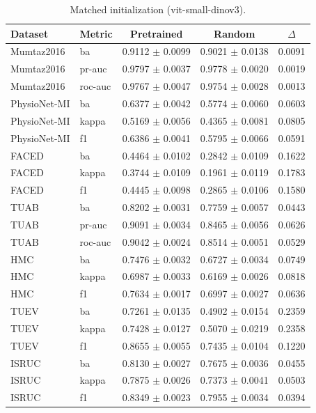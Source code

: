 \begin{table}[tbp]\centering\scriptsize\caption{Matched initialization (vit-small-dinov3).}\begin{tabular}{@{}l l c c c@{}}\toprule Dataset & Metric & Pretrained & Random & $\Delta$ \\ \midrule
Mumtaz2016 & ba & 0.9112 $\pm$ 0.0099 & 0.9021 $\pm$ 0.0138 & 0.0091 \\
Mumtaz2016 & pr-auc & 0.9797 $\pm$ 0.0037 & 0.9778 $\pm$ 0.0020 & 0.0019 \\
Mumtaz2016 & roc-auc & 0.9767 $\pm$ 0.0047 & 0.9754 $\pm$ 0.0028 & 0.0013 \\
PhysioNet-MI & ba & 0.6377 $\pm$ 0.0042 & 0.5774 $\pm$ 0.0060 & 0.0603 \\
PhysioNet-MI & kappa & 0.5169 $\pm$ 0.0056 & 0.4365 $\pm$ 0.0081 & 0.0805 \\
PhysioNet-MI & f1 & 0.6386 $\pm$ 0.0041 & 0.5795 $\pm$ 0.0066 & 0.0591 \\
FACED & ba & 0.4464 $\pm$ 0.0102 & 0.2842 $\pm$ 0.0109 & 0.1622 \\
FACED & kappa & 0.3744 $\pm$ 0.0109 & 0.1961 $\pm$ 0.0119 & 0.1783 \\
FACED & f1 & 0.4445 $\pm$ 0.0098 & 0.2865 $\pm$ 0.0106 & 0.1580 \\
TUAB & ba & 0.8202 $\pm$ 0.0031 & 0.7759 $\pm$ 0.0057 & 0.0443 \\
TUAB & pr-auc & 0.9091 $\pm$ 0.0034 & 0.8465 $\pm$ 0.0056 & 0.0626 \\
TUAB & roc-auc & 0.9042 $\pm$ 0.0024 & 0.8514 $\pm$ 0.0051 & 0.0529 \\
HMC & ba & 0.7476 $\pm$ 0.0032 & 0.6727 $\pm$ 0.0034 & 0.0749 \\
HMC & kappa & 0.6987 $\pm$ 0.0033 & 0.6169 $\pm$ 0.0026 & 0.0818 \\
HMC & f1 & 0.7634 $\pm$ 0.0017 & 0.6997 $\pm$ 0.0027 & 0.0636 \\
TUEV & ba & 0.7261 $\pm$ 0.0135 & 0.4902 $\pm$ 0.0154 & 0.2359 \\
TUEV & kappa & 0.7428 $\pm$ 0.0127 & 0.5070 $\pm$ 0.0219 & 0.2358 \\
TUEV & f1 & 0.8655 $\pm$ 0.0055 & 0.7435 $\pm$ 0.0104 & 0.1220 \\
ISRUC & ba & 0.8130 $\pm$ 0.0027 & 0.7675 $\pm$ 0.0036 & 0.0455 \\
ISRUC & kappa & 0.7875 $\pm$ 0.0026 & 0.7373 $\pm$ 0.0041 & 0.0503 \\
ISRUC & f1 & 0.8349 $\pm$ 0.0023 & 0.7955 $\pm$ 0.0034 & 0.0394 \\

\end{tabular}
\end{table}
